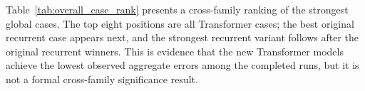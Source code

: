\begin{table}[t]
\centering
\caption{Original recurrent significance summary against \texttt{lstm\_data}.}
\label{tab:stats_results}
\footnotesize
\setlength{\tabcolsep}{3pt}
\end{table}

Table~\ref{tab:overall_case_rank} presents a cross-family ranking of the strongest global cases. The top eight positions are all Transformer cases; the best original recurrent case appears next, and the strongest recurrent variant follows after the original recurrent winners. This is evidence that the new Transformer models achieve the lowest observed aggregate errors among the completed runs, but it is not a formal cross-family significance result.

